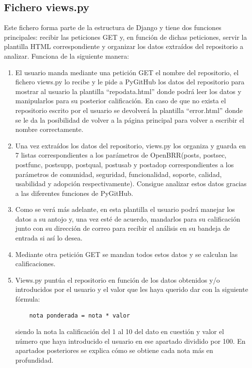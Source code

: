 \documentclass[a4paper, 12pt]{book}
\begin{document}
\subsection{Fichero views.py}
\label{sec:views.py}
Este fichero forma parte de la estructura de Django y tiene dos funciones principales: recibir las peticiones GET y, en función de dichas peticiones, servir la plantilla HTML correspondiente y organizar los datos extraídos del repositorio a analizar. Funciona de la siguiente manera:
\begin{enumerate}
	\item El usuario manda mediante una petición GET el nombre del repositorio, el fichero views.py lo recibe y le pide a PyGitHub los datos del repositorio para mostrar al usuario la plantilla ``repo\textunderscore data.html'' donde podrá leer los datos y manipularlos para su posterior calificación. En caso de que no exista el repositorio escrito por el usuario se devolverá la plantilla ``error.html'' donde se le da la posibilidad de volver a la página principal para volver a escribir el nombre correctamente.
	\item Una vez extraídos los datos del repositorio, views.py los organiza y guarda en 7 listas correspondientes a los parámetros de OpenBRR(posts, post\textunderscore sec, post\textunderscore func, post\textunderscore supp, post\textunderscore qual, post\textunderscore usab y post\textunderscore adop correspondientes a los parámetros de comunidad, seguridad, funcionalidad, soporte, calidad, usabilidad y adopción respectivamente). Consigue analizar estos datos gracias a las diferentes funciones de PyGitHub.
	\item Como se verá más adelante, en esta plantilla el usuario podrá manejar los datos a su antojo y, una vez esté de acuerdo, mandarlos para su calificación junto con su dirección de correo para recibir el análisis en su bandeja de entrada si así lo desea.
	\item Mediante otra petición GET se mandan todos estos datos y se calculan las calificaciones.
	\item Views.py puntúa el repositorio en función de los datos obtenidos y/o introducidos por el usuario y el valor que les haya querido dar con la siguiente fórmula: \begin{verbatim}
	nota ponderada = nota * valor
	\end{verbatim}
	siendo la nota la calificación del 1 al 10 del dato en cuestión y valor el número que haya introducido el usuario en ese apartado dividido por 100. En apartados posteriores se explica cómo se obtiene cada nota más en profundidad.

\end{enumerate}
\end{document}
